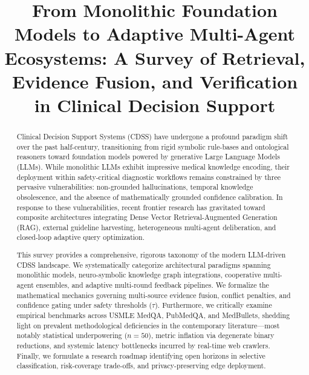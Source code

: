 \documentclass[conference]{IEEEtran}
\begin{document}
\title{From Monolithic Foundation Models to Adaptive Multi-Agent Ecosystems: A Survey of Retrieval, Evidence Fusion, and Verification in Clinical Decision Support}

\author{
}

\maketitle

\begin{abstract}
Clinical Decision Support Systems (CDSS) have undergone a profound paradigm shift over the past half-century, transitioning from rigid symbolic rule-bases and ontological reasoners toward foundation models powered by generative Large Language Models (LLMs). While monolithic LLMs exhibit impressive medical knowledge encoding, their deployment within safety-critical diagnostic workflows remains constrained by three pervasive vulnerabilities: non-grounded hallucinations, temporal knowledge obsolescence, and the absence of mathematically grounded confidence calibration. In response to these vulnerabilities, recent frontier research has gravitated toward composite architectures integrating Dense Vector Retrieval-Augmented Generation (RAG), external guideline harvesting, heterogeneous multi-agent deliberation, and closed-loop adaptive query optimization. 

This survey provides a comprehensive, rigorous taxonomy of the modern LLM-driven CDSS landscape. We systematically categorize architectural paradigms spanning monolithic models, neuro-symbolic knowledge graph integrations, cooperative multi-agent ensembles, and adaptive multi-round feedback pipelines. We formalize the mathematical mechanics governing multi-source evidence fusion, conflict penalties, and confidence gating under safety thresholds ($\tau$). Furthermore, we critically examine empirical benchmarks across USMLE MedQA, PubMedQA, and MedBullets, shedding light on prevalent methodological deficiencies in the contemporary literature---most notably statistical underpowering ($n=50$), metric inflation via degenerate binary reductions, and systemic latency bottlenecks incurred by real-time web crawlers. Finally, we formulate a research roadmap identifying open horizons in selective classification, risk-coverage trade-offs, and privacy-preserving edge deployment.
\end{abstract}
\end{document}
